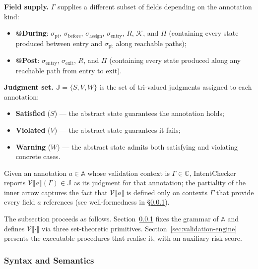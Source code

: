 \documentclass[pdflatex,sn-basic]{sn-jnl}%
\theoremstyle{thmstyleone}%
\theoremstyle{thmstyletwo}%
\theoremstyle{thmstylethree}%
\begin{document}
\smallskip
\noindent\textbf{Field supply.}
$\Gamma$ supplies a different subset of fields depending on the annotation kind:
\begin{itemize}
    \item \textbf{@During}: $\sigma_{\text{pt}}$, $\sigma_{\text{before}}$, $\sigma_{\text{assign}}$, $\sigma_{\text{entry}}$, $R$, $\mathcal{K}$, and $\Pi$ (containing every state produced between entry and $\sigma_{\text{pt}}$ along reachable paths);
    \item \textbf{@Post}: $\sigma_{\text{entry}}$, $\sigma_{\text{exit}}$, $R$, and $\Pi$ (containing every state produced along any reachable path from entry to exit).
\end{itemize}

\smallskip
\noindent\textbf{Judgment set.}
$\mathbb{J} = \{S, V, W\}$ is the set of tri-valued judgments assigned to each annotation:
\begin{itemize}
    \item \textbf{Satisfied} ($S$) --- the abstract state guarantees the annotation holds;
    \item \textbf{Violated} ($V$) --- the abstract state guarantees it fails;
    \item \textbf{Warning} ($W$) --- the abstract state admits both satisfying and violating concrete cases.
\end{itemize}
Given an annotation $a \in \mathbb{A}$ whose validation context is $\Gamma \in \mathbb{C}$, IntentChecker reports $\mathcal{V}\llbracket a \rrbracket(\Gamma) \in \mathbb{J}$ as its judgment for that annotation; the partiality of the inner arrow captures the fact that $\mathcal{V}\llbracket a \rrbracket$ is defined only on contexts $\Gamma$ that provide every field $a$ references (see well-formedness in §\ref{sec:intent-semantics}).

The subsection proceeds as follows.
Section~\ref{sec:intent-semantics} fixes the grammar of $\mathbb{A}$ and defines $\mathcal{V}\llbracket \cdot \rrbracket$ via three set-theoretic primitives.
Section~\ref{sec:validation-engine} presents the executable procedures that realise it, with an auxiliary risk score.

\subsubsection{Syntax and Semantics}\label{sec:intent-semantics}
\end{document}
